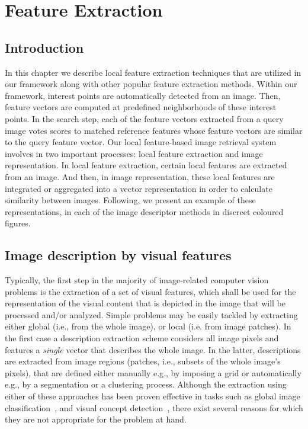 \chapter{Feature Extraction}\label{features}

\section{Introduction}

In this chapter we describe local feature extraction techniques that are utilized in our framework along with other popular feature extraction methods. Within our framework, interest points are automatically detected from an image. Then, feature vectors are computed at predefined neighborhoods of these interest points. In the search step, each of the feature vectors extracted from a query image votes scores to matched reference features whose feature vectors are similar to the query feature vector. Our local feature-based image retrieval system involves in two important processes: local feature extraction and image representation. In local feature extraction, certain local features are extracted from an image. And then, in image representation, these local features are integrated or aggregated into a vector representation in order to calculate similarity between images.
Following, we present an example of these representations, in each of the image descriptor methods in discreet coloured figures.

\section{Image description by visual features}\label{descriptors}
Typically, the first step in the majority of image-related computer vision problems is the extraction of a set of visual features, which shall be used for the representation of the visual content that is depicted in the image that will be processed and/or analyzed. Simple problems may be easily tackled by extracting either global (i.e., from the whole image), or local (i.e. from image patches). In the first case a description extraction scheme considers all image pixels and features a \textit{single} vector that describes the whole image. In the latter, descriptions are extracted from image regions (patches, i.e., subsets of the whole image's pixels), that are defined either manually e.g., by imposing a grid or automatically e.g., by a segmentation or a clustering process. Although the extraction using either of these approaches has been proven effective in tasks such as global image classification~\cite{chapelle1999support}, and visual concept detection~\cite{spyrou2009concept}, there exist several reasons for which they are not appropriate for the problem at hand.

